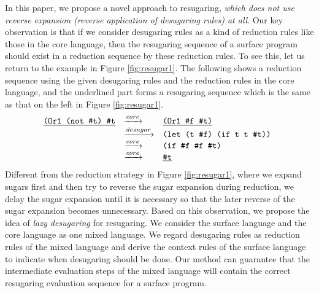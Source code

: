 \label{mark:mention}
In this paper, we propose a novel approach to resugaring, \emph{which does not use reverse expansion (reverse application of desugaring rules) at all}. Our key observation is that
if we consider desugaring rules as a kind of reduction rules like those in the core language,  then the resugaring sequence of a surface program should exist in a reduction sequence by these reduction rules. To see this, let us return to the example in Figure \ref{fig:resugar1}. The following shows a reduction sequence using the given desugaring rules and the reduction rules in the core language, and the underlined part forms a  resugaring sequence which is the same as that on the left in Figure \ref{fig:resugar1}.
\[
\begin{array}{llll}
\underline{\texttt{(Or1 (not \#t) \#t}}
  & \xrightarrow{core} & \underline{\texttt{(Or1 \#f \#t)}}\\
  & \xrightarrow{desugar} & \texttt{(let (t \#f) (if t t \#t)) }\\
	& \xrightarrow{core} & \texttt{(if \#f \#f \#t)}\\
	& \xrightarrow{core} & \underline{\texttt{\#t}}
\end{array}
\]
Different from the reduction strategy in Figure \ref{fig:resugar1}, where we expand sugars first and then try to reverse the sugar expansion during reduction, we delay the sugar expansion until it is necessary so that the later reverse of the sugar expansion becomes unnecessary.
Based on this observation, we propose the idea of {\em lazy desugaring} for resugaring.
We consider the surface language and the core language as one mixed language. We regard desugaring rules as reduction rules of the mixed language and derive the context rules of the surface language to indicate when desugaring should be done. Our method can guarantee that the intermediate evaluation steps of the mixed language will contain the correct resugaring evaluation sequence for a surface program.

